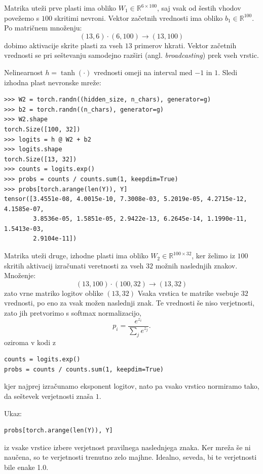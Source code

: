 Matrika uteži prve plasti ima obliko $W_1 \in \mathbb{R}^{6 \times 100}$,
saj vsak od šestih vhodov povežemo s $100$ skritimi nevroni. Vektor začetnih vrednosti ima obliko $b_1 \in \mathbb{R}^{100}$. Po matričnem množenju:
\[
(13,6)\cdot(6,100)\rightarrow(13,100)
\]
dobimo aktivacije skrite plasti za vseh $13$ primerov hkrati. Vektor začetnih vrednosti se pri seštevanju samodejno razširi (angl. \emph{broadcasting}) prek vseh vrstic.

Nelinearnost $h = \tanh(\cdot)$ vrednosti omeji na interval med $-1$ in $1$. Sledi izhodna plast nevronske mreže:
%
\vspace*{3mm}
\begin{lstlisting}
>>> W2 = torch.randn((hidden_size, n_chars), generator=g)
>>> b2 = torch.randn((n_chars), generator=g)
>>> W2.shape
torch.Size([100, 32])
>>> logits = h @ W2 + b2
>>> logits.shape
torch.Size([13, 32])
>>> counts = logits.exp()
>>> probs = counts / counts.sum(1, keepdim=True)
>>> probs[torch.arange(len(Y)), Y]
tensor([3.4551e-08, 4.0015e-10, 7.3008e-03, 5.2019e-05, 4.2715e-12, 4.1585e-07,
        3.8536e-05, 1.5851e-05, 2.9422e-13, 6.2645e-14, 1.1990e-11, 1.5413e-03,
        2.9104e-11])
\end{lstlisting}

Matrika uteži druge, izhodne plasti ima obliko $W_2 \in \mathbb{R}^{100 \times 32}$, ker želimo iz $100$ skritih aktivacij izračunati veretnosti za vseh $32$ možnih naslednjih znakov. Množenje:
\[
(13,100)\cdot(100,32)\rightarrow(13,32)
\]
zato vrne matriko logitov oblike $(13, 32)$ Vsaka vrstica te matrike vsebuje $32$ vrednosti, po eno za vsak možen naslednji znak. Te vrednosti še niso verjetnosti, zato jih pretvorimo s softmax normalizacijo,
\[
p_i = \frac{e^{z_i}}{\sum_j e^{z_j}}.
\]
oziroma v kodi z 
\vspace*{3mm}
\begin{lstlisting}
counts = logits.exp()
probs = counts / counts.sum(1, keepdim=True)
\end{lstlisting}
kjer najprej izračunamo eksponent logitov, nato pa vsako vrstico normiramo tako, da seštevek verjetnosti znaša $1$.

Ukaz:
\vspace*{3mm}
\begin{lstlisting}
probs[torch.arange(len(Y)), Y]
\end{lstlisting}
iz vsake vrstice izbere verjetnost pravilnega naslednjega znaka. Ker mreža še ni naučena, so te verjetnosti trenutno zelo majhne. Idealno, seveda, bi te verjetnosti bile enake 1.0.

